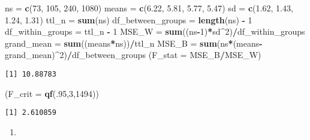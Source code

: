 \documentclass[]{article}
\newenvironment{Shaded}{\begin{snugshade}}{\end{snugshade}}
\newcommand{\KeywordTok}[1]{\textcolor[rgb]{0.13,0.29,0.53}{\textbf{#1}}}
\newcommand{\DataTypeTok}[1]{\textcolor[rgb]{0.13,0.29,0.53}{#1}}
\newcommand{\DecValTok}[1]{\textcolor[rgb]{0.00,0.00,0.81}{#1}}
\newcommand{\FloatTok}[1]{\textcolor[rgb]{0.00,0.00,0.81}{#1}}
\newcommand{\StringTok}[1]{\textcolor[rgb]{0.31,0.60,0.02}{#1}}
\newcommand{\OperatorTok}[1]{\textcolor[rgb]{0.81,0.36,0.00}{\textbf{#1}}}
\newcommand{\NormalTok}[1]{#1}
\begin{document}
\begin{Shaded}
\begin{Highlighting}[]
\NormalTok{ns =}\StringTok{ }\KeywordTok{c}\NormalTok{(}\DecValTok{73}\NormalTok{, }\DecValTok{105}\NormalTok{, }\DecValTok{240}\NormalTok{, }\DecValTok{1080}\NormalTok{)}
\NormalTok{means =}\StringTok{ }\KeywordTok{c}\NormalTok{(}\FloatTok{6.22}\NormalTok{, }\FloatTok{5.81}\NormalTok{, }\FloatTok{5.77}\NormalTok{, }\FloatTok{5.47}\NormalTok{)}
\NormalTok{sd =}\StringTok{ }\KeywordTok{c}\NormalTok{(}\FloatTok{1.62}\NormalTok{, }\FloatTok{1.43}\NormalTok{, }\FloatTok{1.24}\NormalTok{, }\FloatTok{1.31}\NormalTok{)}
\NormalTok{ttl_n =}\StringTok{ }\KeywordTok{sum}\NormalTok{(ns)}
\NormalTok{df_between_groups =}\StringTok{ }\KeywordTok{length}\NormalTok{(ns) }\OperatorTok{-}\StringTok{ }\DecValTok{1} 
\NormalTok{df_within_groups =}\StringTok{ }\NormalTok{ttl_n }\OperatorTok{-}\StringTok{ }\DecValTok{1}
\NormalTok{MSE_W =}\StringTok{ }\KeywordTok{sum}\NormalTok{((ns}\OperatorTok{-}\DecValTok{1}\NormalTok{)}\OperatorTok{*}\NormalTok{sd}\OperatorTok{^}\DecValTok{2}\NormalTok{)}\OperatorTok{/}\NormalTok{df_within_groups}
\NormalTok{grand_mean =}\StringTok{ }\KeywordTok{sum}\NormalTok{((means}\OperatorTok{*}\NormalTok{ns))}\OperatorTok{/}\NormalTok{ttl_n}
\NormalTok{MSE_B =}\StringTok{ }\KeywordTok{sum}\NormalTok{(ns}\OperatorTok{*}\NormalTok{(means}\OperatorTok{-}\NormalTok{grand_mean)}\OperatorTok{^}\DecValTok{2}\NormalTok{)}\OperatorTok{/}\NormalTok{df_between_groups}
\NormalTok{(}\DataTypeTok{F_stat =}\NormalTok{ MSE_B}\OperatorTok{/}\NormalTok{MSE_W)}
\end{Highlighting}
\end{Shaded}

\begin{verbatim}
[1] 10.88783
\end{verbatim}

\begin{Shaded}
\begin{Highlighting}[]
\NormalTok{(}\DataTypeTok{F_crit =} \KeywordTok{qf}\NormalTok{(.}\DecValTok{95}\NormalTok{,}\DecValTok{3}\NormalTok{,}\DecValTok{1494}\NormalTok{))}
\end{Highlighting}
\end{Shaded}

\begin{verbatim}
[1] 2.610859
\end{verbatim}

\begin{enumerate}
\def\labelenumi{\alph{enumi}.}
\setcounter{enumi}{1}
\item
\end{enumerate}
\end{document}
